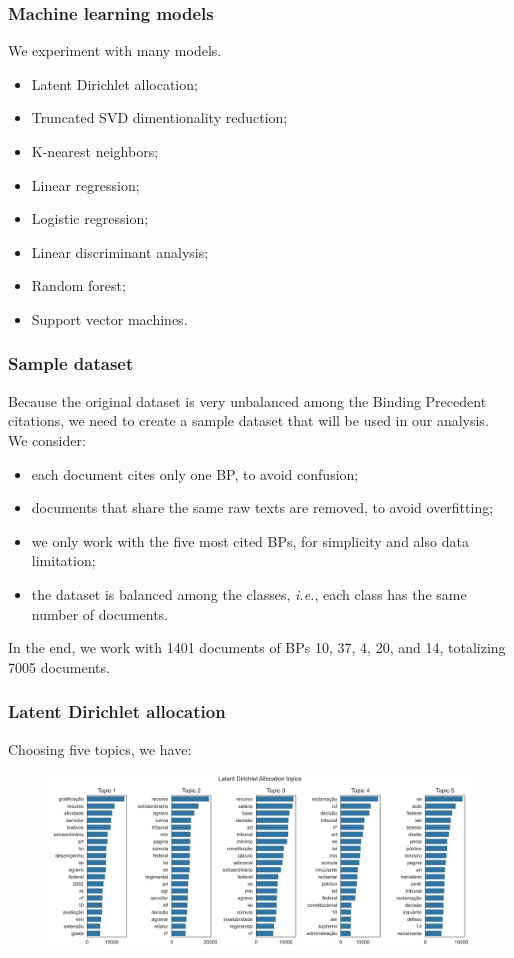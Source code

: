 \documentclass{beamer}
\newcommand{\ie}{\textit{i.e.}}
\begin{document}
    \begin{frame}
        \frametitle{Machine learning models}
        We experiment with many models.
        \begin{itemize}
            \item Latent Dirichlet allocation;
            \item Truncated SVD dimentionality reduction;
            \item K-nearest neighbors;
            \item Linear regression;
            \item Logistic regression;
            \item Linear discriminant analysis;
            \item Random forest;
            \item Support vector machines.
        \end{itemize}
    \end{frame}

    \begin{frame}
        \frametitle{Sample dataset}
        Because the original dataset is very unbalanced among the Binding Precedent citations, we need to create a sample dataset that will be used in our analysis. We consider: \pause
        \begin{itemize}
            \item each document cites only one BP, to avoid confusion;\pause
            \item documents that share the same raw texts are removed, to avoid overfitting;\pause
            \item we only work with the five most cited BPs, for simplicity and also data limitation;\pause
            \item the dataset is balanced among the classes, \ie, each class has the same number of documents.\pause
        \end{itemize}
        In the end, we work with 1401 documents of BPs 10, 37, 4, 20, and 14, totalizing 7005 documents.
    \end{frame}

    \begin{frame}
        \frametitle{Latent Dirichlet allocation}
        Choosing five topics, we have: \pause
        \begin{figure}
            \centering
            \includegraphics[width=\linewidth]{lda_topics.png}
        \end{figure}
    \end{frame}
\end{document}
